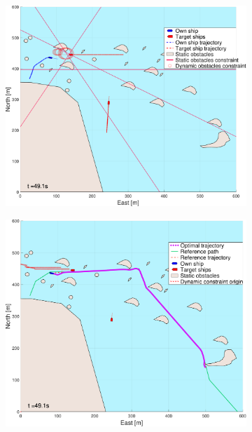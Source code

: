 \begin{figure}[!ht]
\begin{subfigure}[b]{0.494\textwidth}
        \subcaption{}
    \end{subfigure}
    \hfill
    \\
    \begin{subfigure}[b]{0.494\textwidth}
        \centering
        \includegraphics[width=\textwidth]{Images/NewFigures/skjergard_m_trafikk_NEW/_Simple_0fig1_time=50}
        \subcaption{}
    \end{subfigure}
    \hfill
    \begin{subfigure}[b]{0.494\textwidth}
        \centering
        \includegraphics[width=\textwidth]{Images/NewFigures/skjergard_m_trafikk_NEW/_Simple_0fig999_time=50}

\end{subfigure}
\end{figure}

